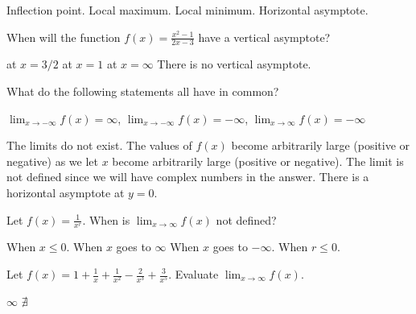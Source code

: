 \documentclass[addpoints, 12pt]{exam}%
\newcommand{\spc}{\vspace*{0.5cm}}
\begin{document}
\begin{questions}
\begin{choices}
\choice Inflection point.
\choice Local maximum.
\choice Local minimum.
\CorrectChoice Horizontal asymptote. 
\end{choices}

\spc

\question[1]

When will the function $f(x) = \frac{x^2 - 1}{2x-3}$ have a vertical asymptote?

\begin{multicols}{2}
\begin{choices}
\CorrectChoice at $x = 3/2$
\choice at $x = 1$
\choice at $x = \infty$
\choice There is no vertical asymptote.
\end{choices}
\end{multicols}

\spc

\question[1]

What do the following statements all have in common?

$\lim_{x \to -\infty} f(x) = \infty$, $\lim_{x \to -\infty} f(x) = -\infty$, $\lim_{x \to \infty} f(x) = -\infty$

\begin{choices}
\choice The limits do not exist.
\CorrectChoice The values of $f(x)$ become arbitrarily large (positive or negative) as we let $x$ become arbitrarily large (positive or negative).
\choice The limit is not defined since we will have complex numbers in the answer.
\choice There is a horizontal asymptote at $y = 0$.
\end{choices}

\newpage

\question[1]

Let $f(x) = \frac{1}{x^r}$. When is $\lim_{x \to \infty} f(x)$ not defined?

\begin{multicols}{2}
\begin{choices}
\choice When $x \leq 0$.
\choice When $x$ goes to $\infty$
\choice When $x$ goes to $-\infty$.
\CorrectChoice When $ r \leq 0$.
\end{choices}
\end{multicols}

\question[1]

Let $f(x) = 1 + \frac{1}{x} + \frac{1}{x^2} - \frac{2}{x^3} + \frac{3}{x^5}$. Evaluate $\lim_{x \to \infty} f(x)$.

\begin{multicols}{2}
\begin{choices}
\choice $\infty$
\choice $\nexists$
\end{choices}
\end{multicols}

\spc

\end{questions}
\end{document}
